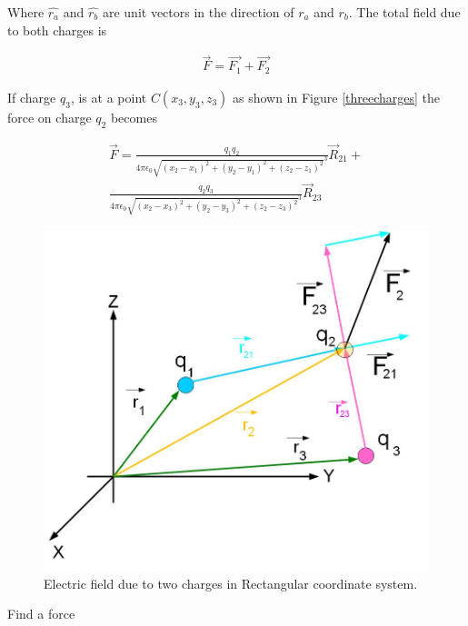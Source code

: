 \documentclass{ximera}
\begin{document}
Where $\hat{r_a}$ and $\hat{r_b}$ are unit vectors in the direction of $r_a$ and $r_b$. The total field due to both charges is


\begin{eqnarray}
\vec{F}=\vec{F_1} + \vec{F_2} 
\end{eqnarray}




If charge $q_3$, is at a point $C(x_3,y_3,z_3)$ as shown in Figure \ref{threecharges} the force on charge $q_2$  becomes

\begin{eqnarray}
\vec{F}= \frac{q_1 q_2}{4 \pi \epsilon_{0} {\sqrt{(x_2 - x_1)^2 +(y_2 - y_1)^2 +  (z_2 - z_1)^2}^3}} \vec{R}_{21} + \\ \nonumber
 \frac{q_2 q_3}{4 \pi \epsilon_{0} {\sqrt{(x_2 - x_3)^2 +(y_2 - y_3)^2 +(z_2 - z_3)^2}
}^3} \vec{R}_{23} 
\end{eqnarray}



\begin{figure}[htbp]
\begin{center}
\includegraphics[scale=0.5]{../jpg/twochargescartcoordFORCE.jpg}
\end{center}
\caption{Electric field due to two charges in  Rectangular coordinate system.}
\label{singlecharge}
\end{figure}



\begin{problem}

Find a force 
\begin{center}
\end{center}

\end{problem}
\end{document}

